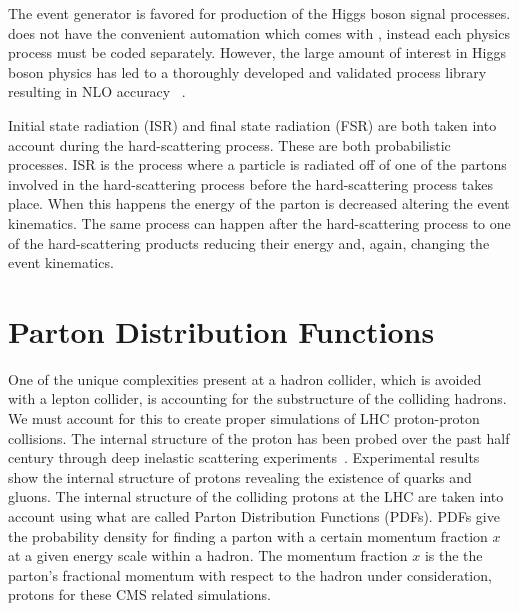 The \POWHEG event generator is favored for production of the Higgs boson signal processes.
\POWHEG does not have the convenient automation which comes with \MGAMCNLO, instead each
physics process must be coded separately. However, the large amount of interest in Higgs boson physics
has led to a thoroughly developed and validated process library resulting in NLO accuracy
~\cite{Alioli:2010xa,Alioli:2008tz,Brein:2003wg,Ravindran:2003um,deFlorian:2012mx}.

Initial state radiation (ISR) and final state radiation (FSR) are both taken into account
during the hard-scattering process. These are both probabilistic processes.
ISR is the process where a particle is radiated off of
one of the partons involved in the hard-scattering process before the hard-scattering process
takes place. When this happens the energy of the parton is decreased altering the event
kinematics. The same process can happen after the hard-scattering process to one of the
hard-scattering products reducing their energy and, again, changing the event kinematics.



\section{Parton Distribution Functions}
\label{sec:sim_pdf}
One of the unique complexities present at a hadron collider, which is avoided with a
lepton collider, is accounting for the substructure of the colliding hadrons. 
We must account for this to create proper simulations
of LHC proton-proton collisions. The internal structure of the proton
has been probed over the past half century through deep inelastic scattering
experiments~\cite{Breidenbach:1969kd, PhysRevLett.23.930}.
Experimental results show the internal structure of protons revealing the existence of
quarks and gluons. The internal structure of the colliding protons at the LHC are taken into
account using what are called Parton Distribution Functions (PDFs). PDFs give the probability
density for finding a parton with a certain momentum fraction $x$ at a given
energy scale within a hadron. The momentum fraction $x$ is the the parton's fractional momentum with respect
to the hadron under consideration, protons for these CMS related simulations. 

